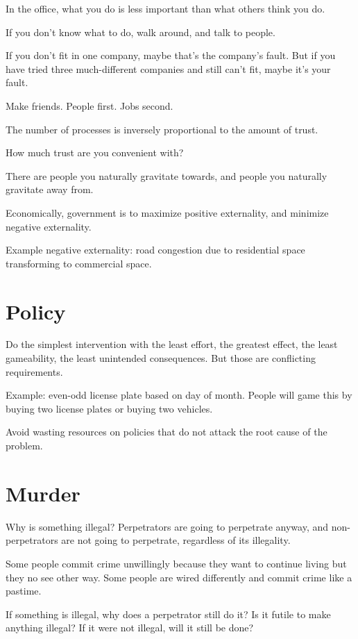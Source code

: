 In the office, what you do is less important
than what others think you do.

If you don't know what to do, walk around, and talk to people.

If you don't fit in one company,
maybe that's the company's fault.
But if you have tried three much-different companies
and still can't fit, maybe it's your fault.

Make friends.
People first.
Jobs second.

The number of processes is inversely proportional to the amount of trust.

How much trust are you convenient with?

There are people you naturally gravitate towards,
and people you naturally gravitate away from.

Economically, government is to maximize positive externality,
and minimize negative externality.

Example negative externality:
road congestion due to residential space transforming to commercial space.

\section{Policy}

Do the simplest intervention with the least effort,
the greatest effect, the least gameability,
the least unintended consequences.
But those are conflicting requirements.

Example: even-odd license plate based on day of month.
People will game this by buying two license plates or buying two vehicles.

Avoid wasting resources on policies that
do not attack the root cause of the problem.

\section{Murder}

Why is something illegal?
Perpetrators are going to perpetrate anyway,
and non-perpetrators are not going to perpetrate,
regardless of its illegality.

Some people commit crime unwillingly because they
want to continue living but they no see other way.
Some people are wired differently and commit crime like a pastime.

If something is illegal, why does a perpetrator still do it?
Is it futile to make anything illegal?
If it were not illegal, will it still be done?

